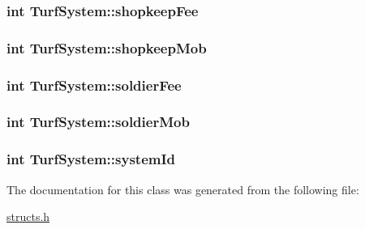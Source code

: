 \hypertarget{classTurfSystem_a07d7f9ef716c90576e025f2aa723a34d}{
\subsubsection[{shopkeep\-Fee}]{\setlength{\rightskip}{0pt plus 5cm}int Turf\-System\-::shopkeep\-Fee}}\label{classTurfSystem_a07d7f9ef716c90576e025f2aa723a34d}
\hypertarget{classTurfSystem_abcafdb36f781eb1e8e67e8e3543a7e3e}{
\subsubsection[{shopkeep\-Mob}]{\setlength{\rightskip}{0pt plus 5cm}int Turf\-System\-::shopkeep\-Mob}}\label{classTurfSystem_abcafdb36f781eb1e8e67e8e3543a7e3e}
\hypertarget{classTurfSystem_ab6ce40d3de05363ce523dea3e60e021d}{
\subsubsection[{soldier\-Fee}]{\setlength{\rightskip}{0pt plus 5cm}int Turf\-System\-::soldier\-Fee}}\label{classTurfSystem_ab6ce40d3de05363ce523dea3e60e021d}
\hypertarget{classTurfSystem_a033e759d856e32306f5331b5dd418c5c}{
\subsubsection[{soldier\-Mob}]{\setlength{\rightskip}{0pt plus 5cm}int Turf\-System\-::soldier\-Mob}}\label{classTurfSystem_a033e759d856e32306f5331b5dd418c5c}
\hypertarget{classTurfSystem_aa5746034cee0ced8cba900b27e0ec09a}{
\subsubsection[{system\-Id}]{\setlength{\rightskip}{0pt plus 5cm}int Turf\-System\-::system\-Id}}\label{classTurfSystem_aa5746034cee0ced8cba900b27e0ec09a}


The documentation for this class was generated from the following file\-:\begin{DoxyCompactItemize}
\item 
\hyperlink{structs_8h}{structs.\-h}\end{DoxyCompactItemize}

